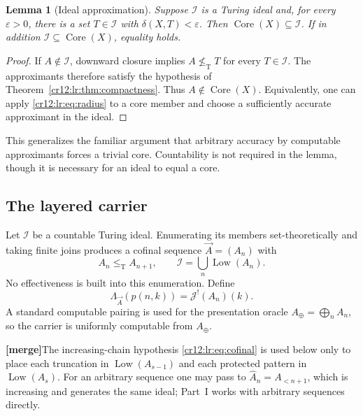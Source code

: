 \documentclass[11pt,letterpaper]{article}
\theoremstyle{plain}
\newtheorem{lemma}[theorem]{Lemma}
\theoremstyle{definition}
\theoremstyle{remark}
\numberwithin{equation}{section}
\newcommand{\leT}{\leq_{\mathrm T}}
\newcommand{\nleT}{\nleq_{\mathrm T}}
\newcommand{\Core}{\operatorname{Core}}
\newcommand{\Low}{\operatorname{Low}}
\newcommand{\I}{\mathcal I}
\newcommand{\mergenote}[1]{\par\smallskip\noindent
 {\small\textsf{\textbf{[merge]}}\enspace #1}\par\smallskip}
\newcommand{\Aplus}{A_{\oplus}}          %
\newcommand{\Alt}[1]{A_{<#1}}            %
\newcommand{\Jfac}{\mathcal J^{!}}       %
\newcommand{\Lam}{\Lambda_{\vec A}}      %
\begin{document}
\begin{lemma}[Ideal approximation]\label{cr12:lr:lem:idealapprox}
Suppose $\I$ is a Turing ideal and, for every $\varepsilon>0$, there is a set $T\in\I$
with $\delta(X,T)<\varepsilon$. Then $\Core(X)\subseteq\I$. If in addition
$\I\subseteq\Core(X)$, equality holds.
\end{lemma}
\begin{proof}
If $A\notin\I$, downward closure implies $A\nleT T$ for every $T\in\I$. The
approximants therefore satisfy the hypothesis of
Theorem~\ref{cr12:lr:thm:compactness}. Thus $A\notin\Core(X)$. Equivalently, one can
apply \eqref{cr12:lr:eq:radius} to a core member and choose a sufficiently accurate
approximant in the ideal.
\end{proof}
This generalizes the familiar argument that arbitrary accuracy by computable
approximants forces a trivial core. Countability is not required in the lemma, though
it is necessary for an ideal to equal a core.

\subsection{The layered carrier}
Let $\I$ be a countable Turing ideal. Enumerating its members set-theoretically and
taking finite joins produces a cofinal sequence $\vec A=(A_n)$ with
\begin{equation}\label{cr12:lr:eq:cofinal}
 A_n\leT A_{n+1},\qquad \I=\bigcup_n\Low(A_n).
\end{equation}
No effectiveness is built into this enumeration. Define
\begin{equation}\label{cr12:lr:eq:carrier}
 \Lam(p(n,k))=\Jfac(A_n)(k).
\end{equation}
A standard computable pairing is used for the presentation oracle
$\Aplus=\bigoplus_n A_n$, so the carrier is uniformly computable from $\Aplus$.

\mergenote{The increasing-chain hypothesis \eqref{cr12:lr:eq:cofinal} is used below only
to place each truncation in $\Low(A_{s-1})$ and each protected pattern in
$\Low(A_s)$. For an arbitrary sequence one may pass to $\hat A_n=\Alt{n+1}$, which
is increasing and generates the same ideal; Part~I works with arbitrary sequences directly.}
\end{document}
